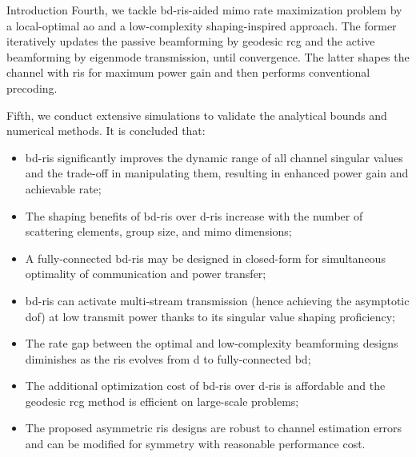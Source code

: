 \documentclass[journal]{IEEEtran}
\begin{document}
\begin{section}{Introduction}
		Fourth, we tackle \gls{bd}-\gls{ris}-aided \gls{mimo} rate maximization problem by a local-optimal \gls{ao} and a low-complexity shaping-inspired approach.
		The former iteratively updates the passive beamforming by geodesic \gls{rcg} and the active beamforming by eigenmode transmission, until convergence.
		The latter shapes the channel with \gls{ris} for maximum power gain and then performs conventional precoding.

		Fifth, we conduct extensive simulations to validate the analytical bounds and numerical methods.
		It is concluded that:
		\begin{itemize}
			\item \gls{bd}-\gls{ris} significantly improves the dynamic range of all channel singular values and the trade-off in manipulating them, resulting in enhanced power gain and achievable rate;
			\item The shaping benefits of \gls{bd}-\gls{ris} over \gls{d}-\gls{ris} increase with the number of scattering elements, group size, and \gls{mimo} dimensions;
			\item A fully-connected \gls{bd}-\gls{ris} may be designed in closed-form for simultaneous optimality of communication and power transfer;
			\item \gls{bd}-\gls{ris} can activate multi-stream transmission (hence achieving the asymptotic \gls{dof}) at low transmit power thanks to its singular value shaping proficiency;
			\item The rate gap between the optimal and low-complexity beamforming designs diminishes as the \gls{ris} evolves from \gls{d} to fully-connected \gls{bd};
			\item The additional optimization cost of \gls{bd}-\gls{ris} over \gls{d}-\gls{ris} is affordable and the geodesic \gls{rcg} method is efficient on large-scale problems;
			\item The proposed asymmetric \gls{ris} designs are robust to channel estimation errors and can be modified for symmetry with reasonable performance cost.
		\end{itemize}


\end{section}
\end{document}
